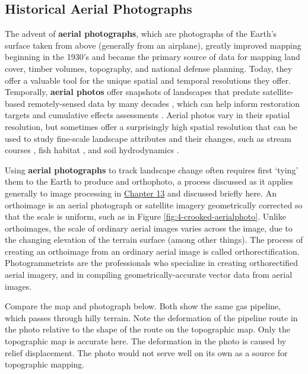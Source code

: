 \documentclass[
]{book}
\begin{document}
\hypertarget{historical-aerial-photographs}{%
\subsection{Historical Aerial Photographs}\label{historical-aerial-photographs}}

The advent of \textbf{aerial photographs}, which are photographs of the Earth's surface taken from above (generally from an airplane), greatly improved mapping beginning in the 1930's and became the primary source of data for mapping land cover, timber volumes, topography, and national defense planning. Today, they offer a valuable tool for the unique spatial and temporal resolutions they offer. Temporally, \textbf{aerial photos} offer snapshots of landscapes that predate satellite-based remotely-sensed data by many decades \citep{morgan_historical_2017}, which can help inform restoration targets and cumulative effects assessments \citep{harker_perspectives_2021}. Aerial photos vary in their spatial resolution, but sometimes offer a surprisingly high spatial resolution that can be used to study fine-scale landscape attributes and their changes, such as stream courses \citep{little_channel_2013}, fish habitat \citep{tomlinson_long-term_2011}, and soil hydrodynamics \citep{harker_perspectives_2021}.

Using \textbf{aerial photographs} to track landscape change often requires first `tying' them to the Earth to produce and orthophoto, a process discussed as it applies generally to image processing in \href{https://ubc-geomatics-textbook.github.io/geomatics-textbook/image-processing.html}{Chapter 13} and discussed briefly here. An orthoimage is an aerial photograph or satellite imagery geometrically corrected so that the scale is uniform, such as in Figure \ref{fig:4-crooked-aerialphoto}. Unlike orthoimages, the scale of ordinary aerial images varies across the image, due to the changing elevation of the terrain surface (among other things). The process of creating an orthoimage from an ordinary aerial image is called orthorectification. Photogrammetrists are the professionals who specialize in creating orthorectified aerial imagery, and in compiling geometrically-accurate vector data from aerial images.

Compare the map and photograph below. Both show the same gas pipeline, which passes through hilly terrain. Note the deformation of the pipeline route in the photo relative to the shape of the route on the topographic map. Only the topographic map is accurate here. The deformation in the photo is caused by relief displacement. The photo would not serve well on its own as a source for topographic mapping.
\end{document}
